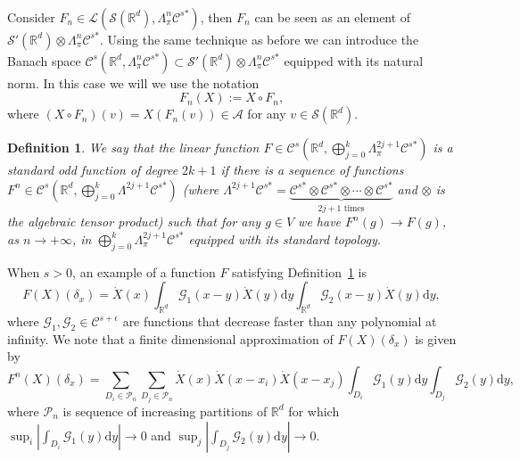 \documentclass{article}
\newcommand{\assign}{:=}
\newcommand{\asterisk}{\mathord{*}}
\newcommand{\mathd}{\mathrm{d}}
\newtheorem{definition}[theorem]{Definition}
\begin{document}
\

Consider $F_n \in \mathcal{L} (\mathcal{S} (\mathbb{R}^d), \Lambda^n_{\pi}
\mathcal{C}^{s \asterisk})$, then $F_n$ can be seen as an element of
$\mathcal{S}' (\mathbb{R}^d) \otimes \Lambda^n_{\pi} \mathcal{C}^{s
\asterisk}$. Using the same technique as before we can introduce the Banach
space $\mathcal{C}^s (\mathbb{R}^d, \Lambda^n_{\pi} \mathcal{C}^{s \asterisk})
\subset \mathcal{S}' (\mathbb{R}^d) \otimes \Lambda^n_{\pi} \mathcal{C}^{s
\asterisk}$ equipped with its natural norm. In this case we will we use the
notation
\begin{equation}
  F_n (X) \assign X \circ F_n, \label{eq:composition}
\end{equation}
where $(X \circ F_n) (v) = X (F_n (v)) \in \mathcal{A}$ for any $v \in
\mathcal{S} (\mathbb{R}^d)$.

\begin{definition}
  \label{definition-F1}We say that the linear function $F \in \mathcal{C}^s
  \left( \mathbb{R}^d, \bigoplus_{j = 0}^k \Lambda^{2 j + 1}_{\pi}
  \mathcal{C}^{s \asterisk} \right)$ is a standard odd function of degree $2 k
  + 1$ if there is a sequence of functions $F^n \in \mathcal{C}^s \left(
  \mathbb{R}^d, \bigoplus_{j = 0}^k \Lambda^{2 j + 1} \mathcal{C}^{s
  \asterisk} \right)$ (where $\Lambda^{2 j + 1} \mathcal{C}^{s \asterisk} =
  \underbrace{\mathcal{C}^{s \asterisk} \otimes \mathcal{C}^{s \asterisk}
  \otimes \cdots \otimes \mathcal{C}^{s \asterisk}}_{\text{$2 j + 1$ times}}$
  and $\otimes$ is the algebraic tensor product) such that for any $g \in V$
  we have $F^n (g) \rightarrow F (g)$, as $n \rightarrow + \infty$, in
  $\bigoplus_{j = 0}^k \Lambda^{2 j + 1}_{\pi} \mathcal{C}^{s \asterisk}$
  equipped with its standard topology.
\end{definition}

\begin{remark}
  When $s > 0$, an example of a function $F$ satisfying
  Definition~\ref{definition-F1} is
  \[ F (X) (\delta_x) = \dot{X} (x) \int_{\mathbb{R}^d} \mathcal{G}_1 (x - y)
     \dot{X} (y) \mathd y \int_{\mathbb{R}^d} \mathcal{G}_2 (x - y) \dot{X}
     (y) \mathd y, \]
  where $\mathcal{G}_1, \mathcal{G}_2 \in \mathcal{C}^{s + \epsilon}$ are
  functions that decrease faster than any polynomial at infinity. We note that
  a finite dimensional approximation of $F (X) (\delta_x)$ is given by
  \[ F^n (X) (\delta_x) = \sum_{D_i \in \mathcal{P}_n} \sum_{D_j \in
     \mathcal{P}_n} \dot{X} (x) \dot{X} (x - x_i) \dot{X} (x - x_j) \int_{D_i}
     \mathcal{G}_1 (y) \mathd y \int_{D_j} \mathcal{G}_2 (y) \mathd y, \]
  where $\mathcal{P}_n$ is sequence of increasing partitions of $\mathbb{R}^d$
  for which $\sup_i \left| \int_{D_i} \mathcal{G}_1 (y) \mathd y \right|
  \rightarrow 0$ and $\sup_j \left| \int_{D_j} \mathcal{G}_2 (y) \mathd y
  \right| \rightarrow 0$.
\end{remark}
\end{document}
